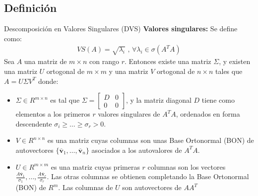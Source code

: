 \documentclass[a4paper, twoside]{article}
\numberwithin{equation}{section}
\numberwithin{figure}{section}
\numberwithin{table}{section}
\newcommand{\vect}[1]{\overline{\textbf{#1}}}
\begin{document}
\subsection{Definición}
\begin{definicion*}{Descomposición en Valores Singulares (DVS)}
	\textbf{Valores singulares:} Se define como:
	\begin{align}
		VS(A)=\sqrt{\lambda_i} \text{ , } \forall \lambda_i \in \sigma(A^T A)
	\end{align}
	Sea $A$ una matriz de $m \times n$ con rango $r$. Entonces existe una matriz $\Sigma$, y existen una matriz $U$ ortogonal de $m \times m$ y una matriz $V$ ortogonal de $n \times n$ tales que $A=U \Sigma V^T$ donde:
	\begin{itemize}
		\item $\Sigma \in R^{m \times n}$ es tal que $\Sigma=\begin{bmatrix}{D}&{0}\\{0}&{0}\end{bmatrix}$, y la matriz diagonal $D$ tiene como elementos a los primeros $r$ valores singulares de $A^T A$, ordenados en forma descendente $\sigma_i \geq \ldots \geq \sigma_r >0$.
		\item $V \in R^{n \times n}$ es una matriz cuyas columnas son unas Base Ortonormal (BON) de autovectores $\{\vect{v}_1,\ldots,\vect{v}_n \}$ asociados a los autovalores de $A^T A$.
		\item $U \in R^{m \times m}$ es una matriz cuyas primeras $r$ columnas son los vectores $\frac{A\vect{v}_1}{\sigma_1},\ldots,\frac{A\vect{v}_r}{\sigma_r}$. Las otras columnas se obtienen completando la Base Ortonormal (BON) de $R^m$. Las columnas de $U$ son autovectores de $A A^T$
	\end{itemize}
\end{definicion*}
\end{document}
